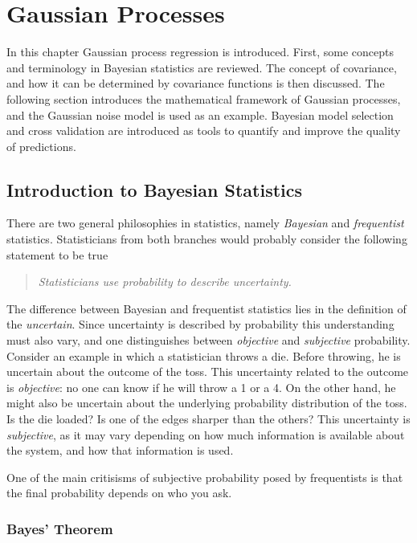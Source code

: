 \documentclass[twoside,english]{uiofysmaster}
\begin{document}
{\chapter{Gaussian Processes}




In this chapter Gaussian process regression is introduced. First, some concepts and terminology in Bayesian statistics are reviewed. The concept of covariance, and how it can be determined by covariance functions is then discussed. The following section introduces the mathematical framework of Gaussian processes, and the Gaussian noise model is used as an example. Bayesian model selection and cross validation are introduced as tools to quantify and improve the quality of predictions.

\section{Introduction to Bayesian Statistics}

There are two general philosophies in statistics, namely \textit{Bayesian} and \textit{frequentist} statistics. Statisticians from both branches would probably consider the following statement to be true
\begin{quote}
\textit{Statisticians use probability to describe uncertainty.}
\end{quote}
The difference between Bayesian and frequentist statistics lies in the definition of the \textit{uncertain}. Since uncertainty is described by probability this understanding must also vary, and one distinguishes between \textit{objective} and \textit{subjective} probability. Consider an example in which a statistician throws a die. Before throwing, he is uncertain about the outcome of the toss. This uncertainty related to the outcome is \textit{objective}: no one can know if he will throw a 1 or a 4. On the other hand, he might also be uncertain about the underlying probability distribution of the toss. Is the die loaded? Is one of the edges sharper than the others? This uncertainty is \textit{subjective}, as it may vary depending on how much information is available about the system, and how that information is used. 

One of the main critisisms of subjective probability posed by frequentists is that the final probability depends on who you ask.

\subsection{Bayes' Theorem}

}
\end{document}
